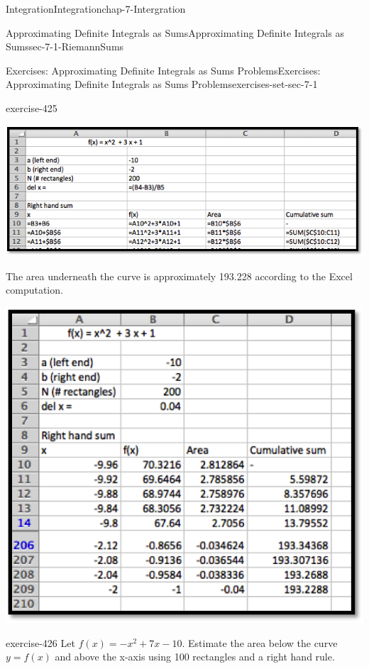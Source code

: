 \documentclass[oneside,10pt,]{book}
\numberwithin{equation}{section}
\begin{document}
\begin{chapterptx}{Integration}{}{Integration}{}{}{chap-7-Intergration}
\begin{sectionptx}{Approximating Definite Integrals as Sums}{}{Approximating Definite Integrals as Sums}{}{}{sec-7-1-RiemannSums}
\begin{exercises-subsection-numberless}{Exercises: Approximating Definite Integrals as Sums Problems}{}{Exercises: Approximating Definite Integrals as Sums Problems}{}{}{exercises-set-sec-7-1}
\begin{divisionexercise}{3}{}{}{exercise-425}
\begin{sidebyside}{1}{0}{0}{0}%
\begin{sbspanel}{1}%
\includegraphics[width=1\linewidth]{images/sec7-1-sol3a.png}
\end{sbspanel}%
\end{sidebyside}%
\par
\hypertarget{p-2578}{}%
The area underneath the curve is approximately 193.228 according to the Excel computation.%
\begin{sidebyside}{1}{0.2}{0.2}{0}%
\begin{sbspanel}{0.6}%
\includegraphics[width=1\linewidth]{images/sec7-1-sol3b.png}
\end{sbspanel}%
\end{sidebyside}%
\end{divisionexercise}%
\begin{divisionexercise}{4}{}{}{exercise-426}%
\hypertarget{p-2579}{}%
Let \(f(x) = -x^2  + 7 x - 10\).  Estimate the area below the curve \(y =  f(x)\) and above the x-axis using 100 rectangles and a right hand rule.%

\end{divisionexercise}
\end{exercises-subsection-numberless}
\end{sectionptx}
\end{chapterptx}
\end{document}
